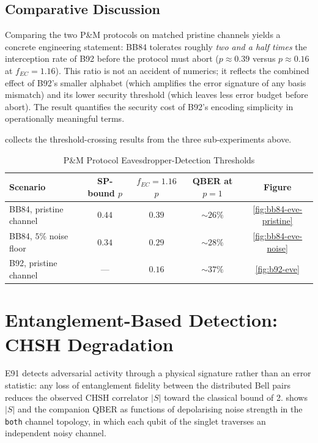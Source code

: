 \documentclass[10pt, a4paper]{report}
\renewcommand{\footnotesize}{\fontsize{8}{9}\selectfont}
\begin{document}
\subsection{Comparative Discussion}

Comparing the two P\&M protocols on matched pristine channels yields a concrete engineering statement: BB84 tolerates roughly \emph{two and a half times} the interception rate of B92 before the protocol must abort ($p\!\approx\!0.39$ versus $p\!\approx\!0.16$ at $f_{EC}\!=\!1.16$). This ratio is not an accident of numerics; it reflects the combined effect of B92's smaller alphabet (which amplifies the error signature of any basis mismatch) and its lower security threshold (which leaves less error budget before abort). The result quantifies the security cost of B92's encoding simplicity in operationally meaningful terms.

 collects the threshold-crossing results from the three sub-experiments above.

\begin{table}[h]
    \centering
    \caption{P\&M Protocol Eavesdropper-Detection Thresholds}
    \label{tab:eve-ranking}
    \footnotesize
    \begin{tabularx}{\linewidth}{@{}l c c c c@{}}
        \toprule
        \textbf{Scenario} & \textbf{SP-bound $p$} & \textbf{$f_{EC}\!=\!1.16$ $p$} & \textbf{QBER at $p\!=\!1$} & \textbf{Figure} \\
        \midrule
        BB84, pristine channel   & $0.44$ & $0.39$ & $\sim\!26\%$ & \ref{fig:bb84-eve-pristine} \\
        BB84, $5\%$ noise floor  & $0.34$ & $0.29$ & $\sim\!28\%$ & \ref{fig:bb84-eve-noise} \\
        B92, pristine channel    & ---    & $0.16$ & $\sim\!37\%$ & \ref{fig:b92-eve} \\
        \bottomrule
    \end{tabularx}
\end{table}

\section{Entanglement-Based Detection: CHSH Degradation}
\label{sec:results-e91}

E91 detects adversarial activity through a physical signature rather than an error statistic: any loss of entanglement fidelity between the distributed Bell pairs reduces the observed CHSH correlator $|S|$ toward the classical bound of 2.  shows $|S|$ and the companion QBER as functions of depolarising noise strength in the \texttt{both} channel topology, in which each qubit of the singlet traverses an independent noisy channel.
\end{document}
